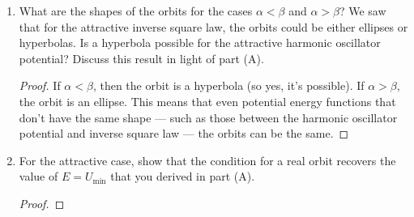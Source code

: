 \documentclass[../psets.tex]{subfiles}
\begin{document}
\begin{enumerate}
\begin{enumerate}
\begin{proof}
\begin{align*}
            \end{align*}
            Substitute in the new variables and rearrange to obtain
            \begin{align*}
                \frac{1}{4}\left( \dv{z}{\theta} \right)^2+z^2 &= \beta^2\\
                \left( \dv{z}{\theta} \right)^2+(2z)^2 &= (2\beta)^2
            \end{align*}
            The solution to this differential equation is
            \begin{equation*}
                z = \beta\cos(2(\theta-\theta_0))
            \end{equation*}
            where $\theta_0$ is a constant of integration. In this case, we will choose $\theta_0=0$. Setting the above equal to the definition of $z$, returning previous substitutions, and simplifying allows us to find the final trajectories, as desired.
            \begin{align*}
                \beta\cos(2\theta) &= v-\alpha\\
                \alpha\cdot 1+\beta(\cos^2\theta-\sin^2\theta) &= u^2\\
                \alpha(\cos^2\theta+\sin^2\theta)+\beta\cos^2\theta-\beta\sin^2\theta &= \frac{1}{r^2}\\
                r^2[(\beta+\alpha)\cos^2\theta+(\alpha-\beta)\sin^2\theta] &= 1
            \end{align*}
        \end{proof}
        \item What are the shapes of the orbits for the cases $\alpha<\beta$ and $\alpha>\beta$? We saw that for the attractive inverse square law, the orbits could be either ellipses or hyperbolas. Is a hyperbola possible for the attractive harmonic oscillator potential? Discuss this result in light of part (A).
        \begin{proof}
            If $\alpha<\beta$, then the orbit is a hyperbola (so yes, it's possible). If $\alpha>\beta$, the orbit is an ellipse. This means that even potential energy functions that don't have the same shape --- such as those between the harmonic oscillator potential and inverse square law --- the orbits can be the same.
        \end{proof}
        \item For the attractive case, show that the condition for a real orbit recovers the value of $E=U_\text{min}$ that you derived in part (A).
        \begin{proof}

\end{proof}
\end{enumerate}
\end{enumerate}
\end{document}
